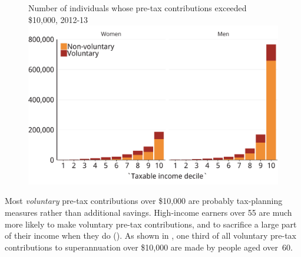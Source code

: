 \begin{figure}
%
{Number of individuals whose pre-tax contributions exceeded \$10,000, 2012-13}\label{fig:SUPER-4-6}
\includegraphics[width=\linewidth]{b5-super-atlas/Figure4-6-1.pdf}

\end{figure}

Most \emph{voluntary} pre-tax contributions over \$10,000 are probably tax-planning measures rather than additional savings. High-income earners over 55 are much more likely to make voluntary pre-tax contributions, and to sacrifice a large part of their income when they do (). As shown in , one third of all voluntary pre-tax contributions to superannuation over \$10,000 are made by people aged over~60. 

